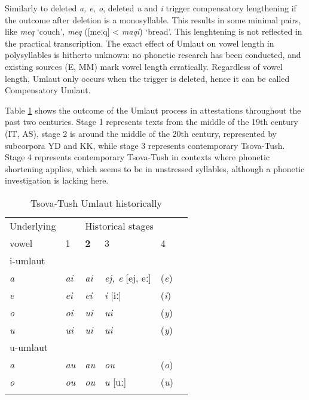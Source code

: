 Similarly to deleted \textit{a, e, o}, deleted \textit{u} and \textit{i} trigger compensatory lengthening if the outcome after deletion is a monosyllable. This results in some minimal pairs, like \textit{meq} `couch', \textit{meq} ([meːq] < \textit{maqi}) `bread'. This lenghtening is not reflected in the practical transcription.
The exact effect of Umlaut on vowel length in polysyllables is hitherto unknown: no phonetic research has been conducted, and existing sources (E, MM) mark vowel length erratically. Regardless of vowel length, Umlaut only occurs when the trigger is deleted, hence it can be called Compensatory Umlaut.

Table \ref{table-umlaut2} shows the outcome of the Umlaut process in attestations throughout the past two centuries. Stage 1 represents texts from the middle of the 19th century (IT, AS), stage 2 is around the middle of the 20th century, represented by subcorpora YD and KK, while stage 3 represents contemporary Tsova-Tush. Stage 4 represents contemporary Tsova-Tush in contexts where phonetic shortening applies, which seems to be in unstressed syllables, although a phonetic investigation is lacking here.

\begin{table}
	\begin{tabular}{llllll}
    \lsptoprule
		Underlying & \multicolumn{4}{c}{{Historical stages}} \\
		{vowel} & {1} & \textbf{2} & {3} & {4} \\
		\midrule
		{i-umlaut} & & \\
		\textit{a} & \textit{ai} & \textit{ai} & \textit{ej, e} [ej, eː] & (\textit{e}) \\
		\textit{e} & \textit{ei} & \textit{ei} & \textit{i} [iː] & (\textit{i}) \\
		\textit{o} & \textit{oi} & \textit{ui} & \textit{ui} & (\textit{y})\\
		\textit{u} & \textit{ui} & \textit{ui} & \textit{ui} & (\textit{y}) \\
		
		\midrule
		{u-umlaut} & & \\
		\textit{a} & \textit{au} & \textit{au} & \textit{ou} & (\textit{o})\\
		\textit{o} & \textit{ou} & \textit{ou} & \textit{u} [uː] & (\textit{u})\\
		
		\lspbottomrule
	\end{tabular}
	\caption{Tsova-Tush Umlaut historically}
	\label{table-umlaut2}
\end{table}

